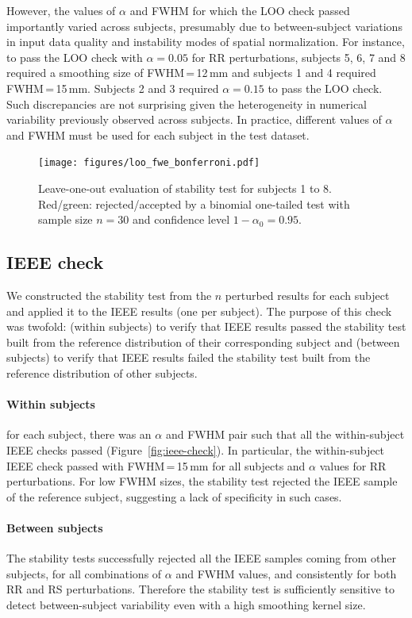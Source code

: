 \documentclass[lettersize,journal]{IEEEtran}
\begin{document}
However, the values of $\alpha$ and FWHM for which the LOO check passed
importantly varied across subjects, presumably due to between-subject
variations in input data quality and instability modes of spatial
normalization. For instance, to pass the LOO check with $\alpha=0.05$ for RR
perturbations, subjects 5, 6, 7 and 8 required a smoothing size of
FWHM\,=\,12\,mm and subjects 1 and 4 required FWHM\,=\,15\,mm. Subjects 2 and 3
required $\alpha=0.15$ to pass the LOO check. Such discrepancies are not
surprising given the heterogeneity in numerical variability previously observed
across subjects. In practice, different values of $\alpha$ and FWHM must be
used for each subject in the test dataset.

\begin{figure}
  \centering
  \texttt{[image: figures/loo\_fwe\_bonferroni.pdf]}
  \caption{Leave-one-out evaluation of stability test for subjects 1 to 8.
    Red/green: rejected/accepted by a binomial one-tailed test with sample size $n=30$ and confidence level $1-\alpha_0=0.95$.}
  \label{fig:loo_bonferroni}
\end{figure}

\subsection{IEEE check}
\label{subsec:ieee_check}

We constructed the stability test from the $n$ perturbed results for each
subject and applied it to the IEEE results (one per subject). The purpose of
this check was twofold: (within subjects) to verify that IEEE results passed
the stability test built from the reference distribution of their corresponding
subject and (between subjects) to verify that IEEE results failed the stability
test built from the reference distribution of other subjects.

\paragraph*{Within subjects} for each subject, there was an $\alpha$ and FWHM pair such that all the within-subject IEEE checks passed (Figure~\ref{fig:ieee-check}). In particular, the within-subject IEEE check passed with FWHM\,=\,15\,mm for all subjects and $\alpha$ values for RR perturbations. For low FWHM sizes, the stability test rejected the IEEE sample of the reference subject, suggesting a lack of specificity in such cases.

\paragraph*{Between subjects} The stability tests successfully rejected all the IEEE samples coming from other subjects, for all combinations of $\alpha$ and FWHM values, and consistently for both RR and RS perturbations. Therefore the stability test is sufficiently sensitive to detect between-subject variability even with a high smoothing kernel size.
\end{document}
